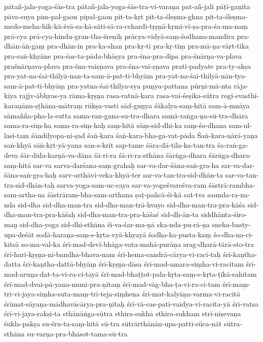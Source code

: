 {{pātañ-jala-yoga-śās-tra
pātañ-jala-yoga-śās-tra-vi-varaṇa
pat-añ-jali
pāṭī-gaṇita
pāva-suya
pim-pal-gaon
pipal-gaon
pit-ta-kṛt
pit-ta-śleṣma-ghna
pit-ta-śleṣma-medo-meha-hik-kā-śvā-sa-kā-sāti-sā-ra-cchardi-tṛṣṇā-kṛmi-vi-ṣa-pra-śa-ma-naṃ
prā-cya
prā-cya-hindu-gran-tha-śreṇiḥ
prācya-vidyā-saṃ-śodhana-mandira
pra-dhān-āṅ-gaṃ
pra-dhān-in
pra-ka-shan
pra-kṛ-ti
pra-kṛ-tiṃ
pra-mā-ṇa-vārt-tika
pra-saṅ-khyāne
pra-śas-ta-pāda-bhāṣya
pra-śna-pra-dīpa
pra-śnārṇa-va-plava
praśnārṇava-plava
pra-śna-vaiṣṇava
pra-śna-vai-ṣṇava
prati-padyate
pra-ty-akṣa
pra-yat-na-śai-thilyā-nan-ta-sam-ā-pat-ti-bhyām
pra-yat-na-śai-thilyā-nān-tya-sam-ā-pat-ti-bhyāṃ
pra-yatna-śai-thilya-sya
puṇya-pattana
pūrṇi-mā-nta
rāja-kīya
rajjv-ābhyas-ya
rāma-kṛṣṇa
rasa-ratnā-kara
rasa-vai-śeṣika-sūtra
rogi-svasthī-karaṇānu-ṣṭhāna-mātraṃ
rūkṣa-vasti
sād-guṇya
śākalya-saṃ-hitā
sam-ā-mnāya
sāmañña-pha-la-sutta
sama-ran-gana-su-tra-dhara
samā-raṅga-ṇa-sū-tra-dhāra
sama-ra-siṃ-ha
sama-ra-siṃ-haḥ
saṃ-hitā
sāṃ-sid-dhi-ka
saṃ-śo-dhana
sam-ul-lasi-tam
śāndilyopa-ni-ṣad
śaṅ-kara
śaṅ-kara-bha-ga-vat-pāda
Śaṅ-kara-nārā-yaṇa
saṅ-khyā
sāṅ-kṛt-yā-yana
san-s-krit
sap-tame
śāra-dā-tila-ka-tan-tra
śa-raṅ-ga-deva
śār-dūla-karṇā-va-dāna
śā-rī-ra
śā-rī-ra-sthāna
śārṅga-dhara
śārṅga-dhara-saṃ-hitā
sar-va
sarva-darśana-saṃ-grahaḥ
sar-va-dar-śāna-saṅ-gra-ha
sar-va-dar-śāna-saṅ-gra-haḥ
sarv-arthāvi-veka-khyā-ter
sar-va-tan-tra-sid-dhān-ta
sar-va-tan-tra-sid-dhān-taḥ
sarva-yoga-sam-uc-caya
sar-va-yogeśvareśva-ram
śāstrā-rambha-sam-artha-na
śāstrāram-bha-sam-arthana
ṣaṭ-pañcā-śi-kā
sat-tva
saunda-ra-na-nda
sid-dha
sid-dha-man-tra
sid-dha-man-trā-hvayo
sid-dha-man-tra-pra-kāśa
sid-dha-man-tra-pra-kāśaḥ
sid-dha-man-tra-pra-kāśaś
sid-dh-ān-ta
siddhānta-śiro-maṇ
sid-dha-yoga
sid-dhi-sthāna
śi-va-śar-ma-ṇā
ska-nda-pu-rā-ṇa
sneha-basty-upa-deśāt
sodā-haraṇa-saṃ-s-kṛta-vyā-khyayā
śodha-ka-pusta-kaṃ
śo-dha-na-ci-kitsā
so-ma-val-ka
śrī-mad-devī-bhāga-vata-mahā-purāṇa
srag-dharā-tārā-sto-tra
śrī-hari-kṛṣṇa-ni-bandha-bhava-nam
śrī-hema-candrā-cārya-vi-raci-taḥ
śrī-kaṇtha-datta
śrī-kaṇtha-dattā-bhyāṃ
śrī-kṛṣṇa-dāsa
śrī-mad-amara-siṃha-vi-racitam
śrī-mad-aruṇa-dat-ta-vi-ra-ci-tayā
śrī-mad-bhaṭṭot-pala-kṛta-saṃ-s-kṛta-ṭīkā-sahitam
śrī-mad-dvai-pā-yana-muni-pra-ṇītaṃ
śrī-mad-vāg-bha-ṭa-vi-ra-ci-tam
śrī-maṃ-trī-vi-jaya-siṃha-suta-maṃ-trī-teja-siṃhena
śrī-mat-kalyāṇa-varma-vi-racitā
śrīmat-sāyaṇa-mādhavācārya-pra-ṇītaḥ
śrī-vā-cas-pati-vaidya-vi-racita-yā
śrī-vatsa
śrī-vi-jaya-rakṣi-ta
sthānāṅga-sūtra
sthira-sukha
sthira-sukham
strī-niṣevaṇa
śukla-pakṣa
su-śru-ta-saṃ-hitā
sū-tra
sūtrārthānān-upa-patti-sūca-nāt
sūtra-sthāna
su-varṇa-pra-bhāsot-tama-sū-tra
}}
